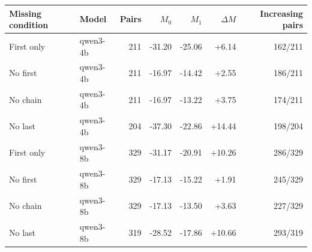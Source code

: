 \begin{tabular}{llrrrrr}
\toprule
Missing condition & Model & Pairs & $M_0$ & $M_1$ & $\Delta M$ & Increasing pairs \\
\midrule
First only & qwen3-4b & 211 & -31.20 & -25.06 & +6.14 & 162/211 \\
No first & qwen3-4b & 211 & -16.97 & -14.42 & +2.55 & 186/211 \\
No chain & qwen3-4b & 211 & -16.97 & -13.22 & +3.75 & 174/211 \\
No last & qwen3-4b & 204 & -37.30 & -22.86 & +14.44 & 198/204 \\
First only & qwen3-8b & 329 & -31.17 & -20.91 & +10.26 & 286/329 \\
No first & qwen3-8b & 329 & -17.13 & -15.22 & +1.91 & 245/329 \\
No chain & qwen3-8b & 329 & -17.13 & -13.50 & +3.63 & 227/329 \\
No last & qwen3-8b & 319 & -28.52 & -17.86 & +10.66 & 293/319 \\
\bottomrule
\end{tabular}
